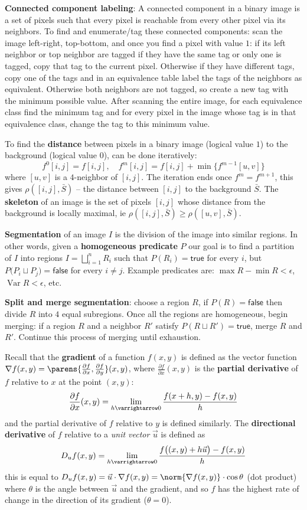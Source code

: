\documentclass[10pt, twocolumn]{article}
\let\bold=\textbf
\begin{document}
\bold{Connected component labeling}: A connected component in a binary image is a set of pixels such that every pixel is reachable from every other pixel via its neighbors.
To find and enumerate/tag these connected components: scan the image left-right, top-bottom, and once you find a pixel with value $1$: if its left neighbor or top neighbor are tagged
if they have the same tag or only one is tagged, copy that tag to the current pixel.
Otherwise if they have different tags, copy one of the tags and in an equivalence table label the tags of the neighbors as equivalent.
Otherwise both neighbors are not tagged, so create a new tag with the minimum possible value.
After scanning the entire image, for each equivalence class find the minimum tag and for every pixel in the image whose tag is in that equivalence class, change the tag to this
minimum value.

To find the \bold{distance} between pixels in a binary image (logical value $1$) to the background (logical value $0$), can be done iteratively:
$$ f^0[i,j] = f[i,j],\quad f^m[i,j] = f[i,j] + \min\{f^{m-1}[u,v]\} $$
where $[u,v]$ is a $4$-neighbor of $[i,j]$.
The iteration ends once $f^{m}=f^{m+1}$, this gives $\rho([i,j],\bar S)$ -- the distance between $[i,j]$ to the background $\bar S$.
The \bold{skeleton} of an image is the set of pixels $[i,j]$ whose distance from the background is locally maximal, ie $\rho([i,j],\bar S)\geq\rho([u,v],\bar S)$.

\bold{Segmentation} of an image $I$ is the division of the image into similar regions.
In other words, given a \bold{homogeneous predicate} $P$ our goal is to find a partition of $I$ into regions $I=\bigsqcup_{i=1}^n R_i$ such that $P(R_i)=\mathsf{true}$ for every $i$, but
$P\bigl(P_i\sqcup P_j\bigr)=\mathsf{false}$ for every $i\neq j$.
Example predicates are: $\max R - \min R < \epsilon$, $\operatorname{Var} R<\epsilon$, etc.

\bold{Split and merge segmentation}: choose a region $R$, if $P(R)=\mathsf{false}$ then divide $R$ into $4$ equal subregions.
Once all the regions are homogeneous, begin merging: if a region $R$ and a neighbor $R'$ satisfy $P(R\sqcup R')=\mathsf{true}$, merge $R$ and $R'$.
Continue this process of merging until exhaustion.

\vfill\break
Recall that the \bold{gradient} of a function $f(x,y)$ is defined as the vector function $\nabla f(x,y)=\parens{\frac{\partial f}{\partial x}, \frac{\partial f}{\partial y}}(x,y)$, where
$\frac{\partial f}{\partial x}(x,y)$ is the \bold{partial derivative} of $f$ relative to $x$ at the point $(x,y)$:
$$ \frac{\partial f}{\partial x}(x,y) = \lim_{h\varrightarrow0}\frac{f(x+h,y) - f(x,y)}h $$
and the partial derivative of $f$ relative to $y$ is defined similarly.
The \bold{directional derivative} of $f$ relative to a \textit{unit vector} $\vec u$ is defined as
$$ D_u f(x,y) = \lim_{h\varrightarrow0}\frac{f\bigl((x,y)+h\vec u\bigr)-f(x,y)}h $$
this is equal to $D_u f(x,y) = \vec u\cdot\nabla f(x,y)=\norm{\nabla f(x,y)}\cdot\cos\theta$ (dot product) where $\theta$ is the angle between $\vec u$ and the gradient, and so $f$ has the
highest rate of change in the direction of its gradient ($\theta=0$).
\end{document}
